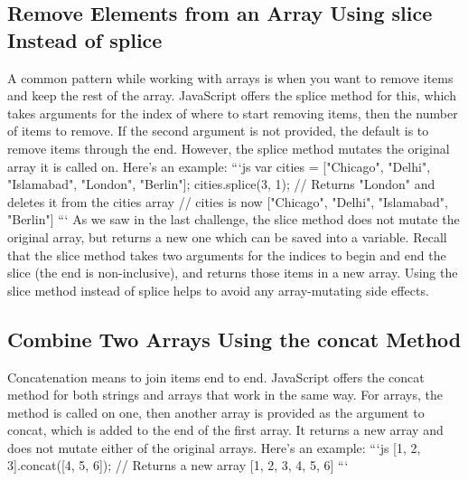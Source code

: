 \documentclass{article}%
\begin{document}
\subsection{Remove Elements from an Array Using slice Instead of splice}%
\label{subsec:RemoveElementsfromanArrayUsingsliceInsteadofsplice}%
A common pattern while working with arrays is when you want to remove items and keep the rest of the array. JavaScript offers the splice method for this, which takes arguments for the index of where to start removing items, then the number of items to remove. If the second argument is not provided, the default is to remove items through the end. However, the splice method mutates the original array it is called on. Here's an example:\newline%
```js\newline%
var cities = {[}"Chicago", "Delhi", "Islamabad", "London", "Berlin"{]};\newline%
cities.splice(3, 1); // Returns "London" and deletes it from the cities array\newline%
// cities is now {[}"Chicago", "Delhi", "Islamabad", "Berlin"{]}\newline%
```\newline%
As we saw in the last challenge, the slice method does not mutate the original array, but returns a new one which can be saved into a variable. Recall that the slice method takes two arguments for the indices to begin and end the slice (the end is non{-}inclusive), and returns those items in a new array. Using the slice method instead of splice helps to avoid any array{-}mutating side effects.\newline%

%
\subsection{Combine Two Arrays Using the concat Method}%
\label{subsec:CombineTwoArraysUsingtheconcatMethod}%
Concatenation means to join items end to end. JavaScript offers the concat method for both strings and arrays that work in the same way. For arrays, the method is called on one, then another array is provided as the argument to concat, which is added to the end of the first array. It returns a new array and does not mutate either of the original arrays. Here's an example:\newline%
```js\newline%
{[}1, 2, 3{]}.concat({[}4, 5, 6{]});\newline%
// Returns a new array {[}1, 2, 3, 4, 5, 6{]}\newline%
```\newline%
\end{document}
